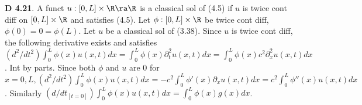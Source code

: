 {\bf D 4.21}. A funct $u: [0,L] \times \R \ra \R$ is a classical sol of (4.5) if $u$ is twice cont diff on $[0,L]\times \R$ and satisfies (4.5). Let $\phi: [0,L] \times \R$ be twice cont diff, $\phi(0)=0=\phi(L)$. Let $u$ be a classical sol of (3.38). Since $u$ is twice cont diff, the following derivative exists and satisfies $(d^2/dt^2)\int_0^L \phi(x) u(x,t) dx = \int_0^L \phi(x) \partial_t^2u(x,t)dx=\int_0^L\phi(x)c^2\partial_x^2u(x,t)dx$. Int by parts. Since both $\phi$ and $u$ are 0 for $x = 0,L, (d^2/dt^2)\int_0^L \phi(x)u(x,t)dx=-c^2 \int_0^L \phi'(x) \partial_x u(x,t)dx =c^2\int_0^L\phi''(x)u(x,t)dx$. Similarly  $(d/dt_{[t=0]}) \int_0^L \phi(x) u(x,t)dx = \int_0^L\phi(x)g(x)dx$.  